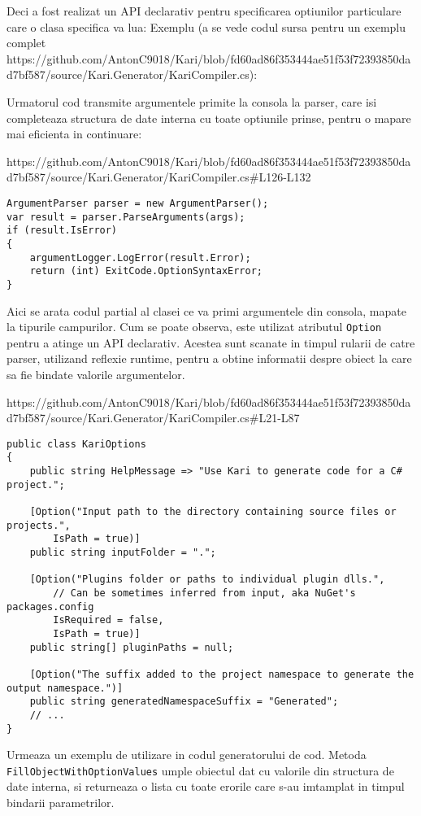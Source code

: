\documentclass{report}
\begin{document}
Deci a fost realizat un API declarativ pentru specificarea optiunilor
particulare care o clasa specifica va lua: Exemplu (a se vede codul
sursa pentru un exemplu complet
https://github.com/AntonC9018/Kari/blob/fd60ad86f353444ae51f53f72393850dad7bf587/source/Kari.Generator/KariCompiler.cs):

Urmatorul cod transmite argumentele primite la consola la parser, care
isi completeaza structura de date interna cu toate optiunile prinse,
pentru o mapare mai eficienta in continuare:

https://github.com/AntonC9018/Kari/blob/fd60ad86f353444ae51f53f72393850dad7bf587/source/Kari.Generator/KariCompiler.cs\#L126-L132

\begin{lstlisting}
ArgumentParser parser = new ArgumentParser();
var result = parser.ParseArguments(args);
if (result.IsError)
{
    argumentLogger.LogError(result.Error);
    return (int) ExitCode.OptionSyntaxError;
}
\end{lstlisting}

Aici se arata codul partial al clasei ce va primi argumentele din
consola, mapate la tipurile campurilor. Cum se poate observa, este
utilizat atributul \texttt{Option} pentru a atinge un API declarativ.
Acestea sunt scanate in timpul rularii de catre parser, utilizand
reflexie runtime, pentru a obtine informatii despre obiect la care sa
fie bindate valorile argumentelor.

https://github.com/AntonC9018/Kari/blob/fd60ad86f353444ae51f53f72393850dad7bf587/source/Kari.Generator/KariCompiler.cs\#L21-L87

\begin{lstlisting}
public class KariOptions
{
    public string HelpMessage => "Use Kari to generate code for a C# project.";

    [Option("Input path to the directory containing source files or projects.", 
        IsPath = true)] 
    public string inputFolder = ".";

    [Option("Plugins folder or paths to individual plugin dlls.",
        // Can be sometimes inferred from input, aka NuGet's packages.config
        IsRequired = false,
        IsPath = true)]
    public string[] pluginPaths = null;

    [Option("The suffix added to the project namespace to generate the output namespace.")]
    public string generatedNamespaceSuffix = "Generated";
    // ...
}
\end{lstlisting}

Urmeaza un exemplu de utilizare in codul generatorului de cod. Metoda
\texttt{FillObjectWithOptionValues} umple obiectul dat cu valorile din
structura de date interna, si returneaza o lista cu toate erorile care
s-au imtamplat in timpul bindarii parametrilor.
\end{document}
